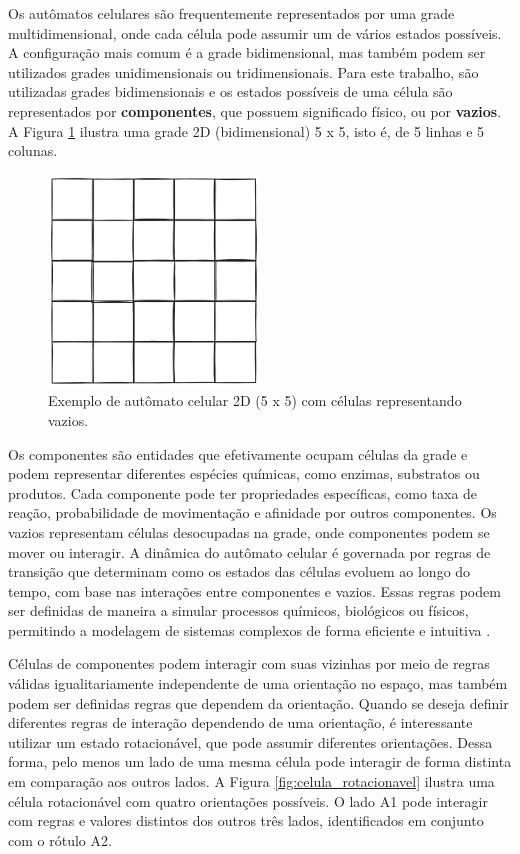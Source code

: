 \documentclass[12pt,oneside]{report}
\begin{document}
Os autômatos celulares são frequentemente representados por uma grade multidimensional, onde cada célula pode assumir um de vários estados possíveis. A configuração mais comum é a grade bidimensional, mas também podem ser utilizados grades unidimensionais ou tridimensionais. Para este trabalho, são utilizadas grades bidimensionais e os estados possíveis de uma célula são representados por \textbf{componentes}, que possuem significado físico, ou por \textbf{vazios}. A Figura \ref{fig:grade_2d} ilustra uma grade 2D (bidimensional) 5 x 5, isto é, de 5 linhas e 5 colunas.

\begin{figure}[H]
    \centering
    \includegraphics[width=0.5\textwidth]{grade_2d.png}
    \caption{\small Exemplo de autômato celular 2D (5 x 5) com células representando vazios.}
    \label{fig:grade_2d}
\end{figure}

Os componentes são entidades que efetivamente ocupam células da grade e podem representar diferentes espécies químicas, como enzimas, substratos ou produtos. Cada componente pode ter propriedades específicas, como taxa de reação, probabilidade de movimentação e afinidade por outros componentes. Os vazios representam células desocupadas na grade, onde componentes podem se mover ou interagir. A dinâmica do autômato celular é governada por regras de transição que determinam como os estados das células evoluem ao longo do tempo, com base nas interações entre componentes e vazios. Essas regras podem ser definidas de maneira a simular processos químicos, biológicos ou físicos, permitindo a modelagem de sistemas complexos de forma eficiente e intuitiva \cite{kier2005}.

Células de componentes podem interagir com suas vizinhas por meio de regras válidas igualitariamente independente de uma orientação no espaço, mas também podem ser definidas regras que dependem da orientação. Quando se deseja definir diferentes regras de interação dependendo de uma orientação, é interessante utilizar um estado rotacionável, que pode assumir diferentes orientações. Dessa forma, pelo menos um lado de uma mesma célula pode interagir de forma distinta em comparação aos outros lados. A Figura \ref{fig:celula_rotacionavel} ilustra uma célula rotacionável com quatro orientações possíveis. O lado A1 pode interagir com regras e valores distintos dos outros três lados, identificados em conjunto com o rótulo A2.
\end{document}
